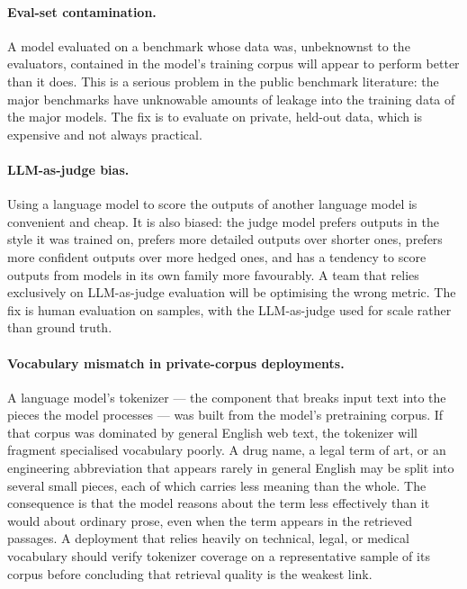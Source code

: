 \paragraph{Eval-set contamination.} A model evaluated on a
benchmark whose data was, unbeknownst to the evaluators,
contained in the model's training corpus will appear to
perform better than it does. This is a serious problem in the
public benchmark literature: the major benchmarks have
unknowable amounts of leakage into the training data of the
major models. The fix is to evaluate on private, held-out
data, which is expensive and not always practical.

\paragraph{LLM-as-judge bias.} Using a language model to
score the outputs of another language model is convenient
and cheap. It is also biased: the judge model prefers outputs
in the style it was trained on, prefers more detailed
outputs over shorter ones, prefers more confident outputs
over more hedged ones, and has a tendency to score outputs
from models in its own family more favourably. A team that
relies exclusively on LLM-as-judge evaluation will be
optimising the wrong metric. The fix is human evaluation on
samples, with the LLM-as-judge used for scale rather than
ground truth.

\paragraph{Vocabulary mismatch in private-corpus deployments.}
A language model's tokenizer --- the component that breaks input
text into the pieces the model processes --- was built from the
model's pretraining corpus. If that corpus was dominated by
general English web text, the tokenizer will fragment
specialised vocabulary poorly. A drug name, a legal term of
art, or an engineering abbreviation that appears rarely in
general English may be split into several small pieces, each of
which carries less meaning than the whole. The consequence is
that the model reasons about the term less effectively than it
would about ordinary prose, even when the term appears in the
retrieved passages. A deployment that relies heavily on
technical, legal, or medical vocabulary should verify tokenizer
coverage on a representative sample of its corpus before
concluding that retrieval quality is the weakest link.

